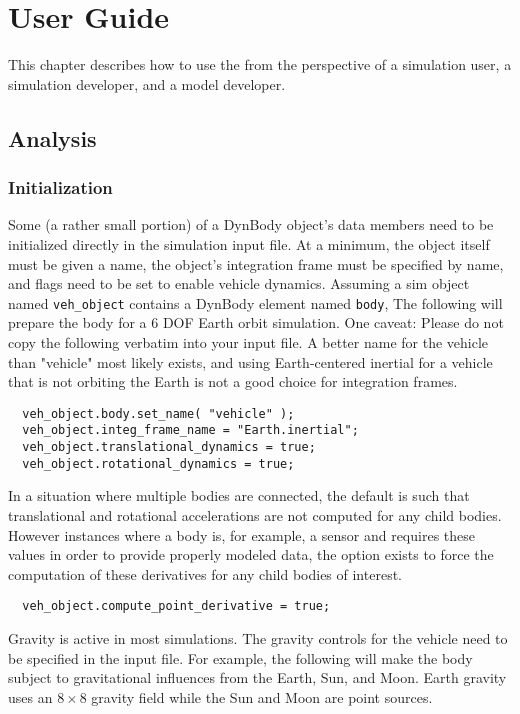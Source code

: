 \chapter{User Guide}\label{ch:user}
This chapter describes how to use the \ModelDesc from the
perspective of a simulation user, a simulation developer,
and a model developer.

\section{Analysis}

\subsection{Initialization}
Some (a rather small portion) of a DynBody object's data members need to
be initialized directly in the simulation input file. At a minimum,
the object itself must be given a name,
the object's integration frame must be specified by name, and
flags need to be set to enable vehicle dynamics.
Assuming a sim object
named \verb+veh_object+ contains a DynBody element named \verb+body+,
The following will prepare the body for a 6 DOF Earth orbit simulation.
One caveat: Please do not copy the following verbatim into your input file.
A better name for the vehicle than "vehicle" most likely exists,
and using Earth-centered inertial for a vehicle that is not orbiting the
Earth is not a good choice for integration frames.

\begin{verbatim}
  veh_object.body.set_name( "vehicle" );
  veh_object.integ_frame_name = "Earth.inertial";
  veh_object.translational_dynamics = true;
  veh_object.rotational_dynamics = true;
\end{verbatim}

In a situation where multiple bodies are connected, the default is such that translational 
and rotational accelerations are not computed for any child bodies.  However instances 
where a body is, for example, a sensor and requires these values in order to provide 
properly modeled data, the option exists to force the computation of these derivatives for any child bodies of interest.
\begin{verbatim}
  veh_object.compute_point_derivative = true;
\end{verbatim}

Gravity is active in most simulations. The gravity controls for the
vehicle need to be specified in the input file. For example, the following
will make the body subject to gravitational influences from the Earth, Sun,
and Moon. Earth gravity uses an $8\times8$ gravity field while the Sun
and Moon are point sources.

